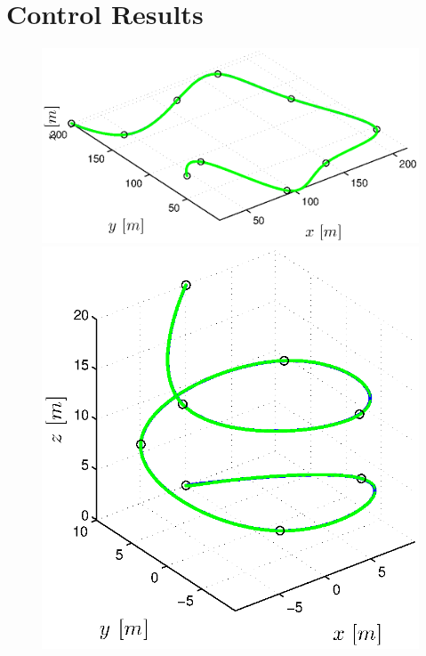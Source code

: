\section{Control Results}
\label{sec:app_trajectory_control_results}

\begin{figure}[h]
  \begin{minipage}[t]{0.32\textwidth}
    \includegraphics[width = \textwidth]{trackings/figure_3D_road_SplineDegree3_trajectoryFollowing_Disturbance_0}
  \end{minipage}
  \hfill
  \begin{minipage}[t]{0.32\textwidth}
    \includegraphics[width = \textwidth]{trackings/figure_3D_helix_SplineDegree3_trajectoryFollowing_Disturbance_0}

\end{minipage}
\end{figure}
